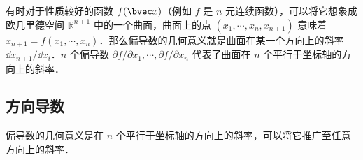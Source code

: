 有时对于性质较好的函数 $f(\bvec x)$（例如 $f$ 是 $n$ 元连续函数），可以将它想象成欧几里德空间 $\mathbb{R}^{n+1}$ 中的一个曲面，曲面上的点 $(x_1,\cdots,x_n,x_{n+1})$ 意味着 $x_{n+1}=f(x_1,\cdots,x_n)$．那么偏导数的几何意义就是曲面在某一个方向上的斜率 $\dd x_{n+1}/\dd x_i$．$n$ 个偏导数 $\partial f/\partial x_1,\cdots,\partial f/\partial x_n$ 代表了曲面在 $n$ 个平行于坐标轴的方向上的斜率．

\subsection{方向导数}
偏导数的几何意义是在 $n$ 个平行于坐标轴的方向上的斜率，可以将它推广至任意方向上的斜率．
